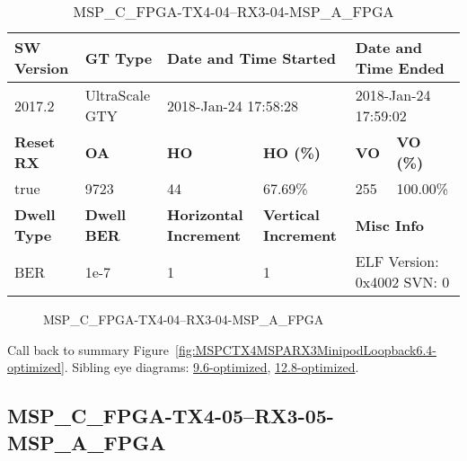 \begin{table}[h]
\centering
\caption{MSP\_C\_FPGA-TX4-04--RX3-04-MSP\_A\_FPGA}
\label{tab:MSPCFPGATX404RX304MSPAFPGA6.4-optimized}
\begin{tabular}{@{}|l|l|l|l|l|l|@{}}
\toprule
\textbf{SW Version}                & \textbf{GT Type}   & \multicolumn{2}{l|}{\textbf{Date and Time Started}}            & \multicolumn{2}{l|}{\textbf{Date and Time Ended}}        \\ \midrule
2017.2                       & UltraScale GTY          & \multicolumn{2}{l|}{2018-Jan-24 17:58:28}                   & \multicolumn{2}{l|}{2018-Jan-24 17:59:02}               \\ \midrule
\textbf{Reset RX}                  & \textbf{OA} & \textbf{HO}   & \textbf{HO (\%)} & \textbf{VO} & \textbf{VO (\%)} \\ \midrule
true & 9723        & 44          & 67.69\%        & 255        & 100.00\%       \\ \midrule
\textbf{Dwell Type}                & \textbf{Dwell BER} & \textbf{Horizontal Increment} & \textbf{Vertical Increment}    & \multicolumn{2}{l|}{\textbf{Misc Info}}                  \\ \midrule
BER                            & 1e-7        & 1        & 1           & \multicolumn{2}{l|}{ELF Version: 0x4002 SVN: 0}                         \\ \bottomrule
\end{tabular}
\end{table}

\begin{figure}[h]
\caption{MSP\_C\_FPGA-TX4-04--RX3-04-MSP\_A\_FPGA} \label{fig:MSPCFPGATX404RX304MSPAFPGA6.4-optimized}
\end{figure}

Call back to summary Figure~\ref{fig:MSPCTX4MSPARX3MinipodLoopback6.4-optimized}.
Sibling eye diagrams: \hyperref[sec:MSPCFPGATX404RX304MSPAFPGA9.6-optimized]{9.6-optimized}, \hyperref[sec:MSPCFPGATX404RX304MSPAFPGA12.8-optimized]{12.8-optimized}.

\clearpage
\newpage


\subsection{MSP\_C\_FPGA-TX4-05--RX3-05-MSP\_A\_FPGA}\label{sec:MSPCFPGATX405RX305MSPAFPGA6.4-optimized}

